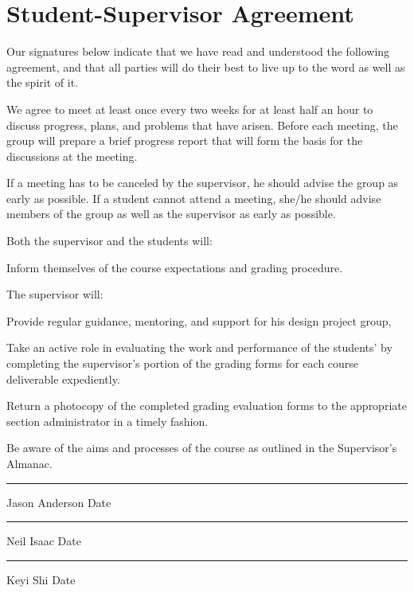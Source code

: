 \section{Student-Supervisor Agreement}

\small{

Our signatures below indicate that we have read and understood the following agreement, and that all parties will do their best to live up to the word as well as the spirit of it.

We agree to meet at least once every two weeks for at least half an hour to discuss progress, plans, and problems that have arisen.
Before each meeting, the group will prepare a brief progress report that will form the basis for the discussions at the meeting.

If a meeting has to be canceled by the supervisor, he should advise the group as early as possible.
If a student cannot attend a meeting, she/he should advise members of the group as well as the supervisor as early as possible.

Both the supervisor and the students will:
\begin{itemlist}
	\item Inform themselves of the course expectations and grading procedure.
\end{itemlist}

The supervisor will:
\begin{itemlist}
	\item Provide regular guidance, mentoring, and support for his design project group,
	\item Take an active role in evaluating the work and performance of the students' by completing the supervisor's portion of the grading forms for each course deliverable expediently.
	\item Return a photocopy of the completed grading evaluation forms to the appropriate section administrator in a timely fashion.
	\item Be aware of the aims and processes of the course as outlined in the Supervisor's Almanac.
\end{itemlist}


\vfill \hrule Jason Anderson \hfill Date \hspace{1.5in}
\vfill \hrule Neil Isaac \hfill Date \hspace{1.5in}
\vfill \hrule Keyi Shi \hfill Date \hspace{1.5in}

}

